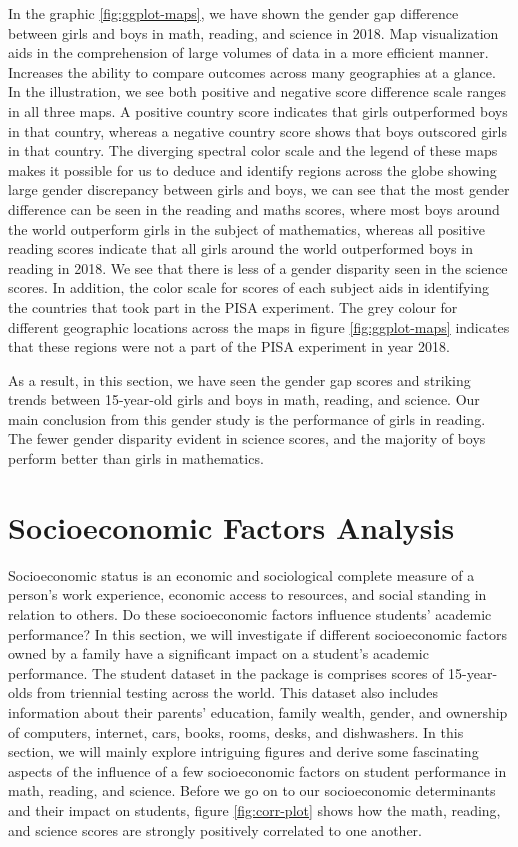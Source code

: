 In the graphic \ref{fig:ggplot-maps}, we have shown the gender gap
difference between girls and boys in math, reading, and science in 2018.
Map visualization aids in the comprehension of large volumes of data in
a more efficient manner. Increases the ability to compare outcomes
across many geographies at a glance. In the illustration, we see both
positive and negative score difference scale ranges in all three maps. A
positive country score indicates that girls outperformed boys in that
country, whereas a negative country score shows that boys outscored
girls in that country. The diverging spectral color scale and the legend
of these maps makes it possible for us to deduce and identify regions
across the globe showing large gender discrepancy between girls and
boys, we can see that the most gender difference can be seen in the
reading and maths scores, where most boys around the world outperform
girls in the subject of mathematics, whereas all positive reading scores
indicate that all girls around the world outperformed boys in reading in
2018. We see that there is less of a gender disparity seen in the
science scores. In addition, the color scale for scores of each subject
aids in identifying the countries that took part in the PISA experiment.
The grey colour for different geographic locations across the maps in
figure \ref{fig:ggplot-maps} indicates that these regions were not a
part of the PISA experiment in year 2018.

As a result, in this section, we have seen the gender gap scores and
striking trends between 15-year-old girls and boys in math, reading, and
science. Our main conclusion from this gender study is the performance
of girls in reading. The fewer gender disparity evident in science
scores, and the majority of boys perform better than girls in
mathematics.

\hypertarget{socioeconomic-factors-analysis}{%
\section{Socioeconomic Factors
Analysis}\label{socioeconomic-factors-analysis}}

Socioeconomic status is an economic and sociological complete measure of
a person's work experience, economic access to resources, and social
standing in relation to others. Do these socioeconomic factors influence
students' academic performance? In this section, we will investigate if
different socioeconomic factors owned by a family have a significant
impact on a student's academic performance. The student dataset in the
 package is comprises scores of 15-year-olds from
triennial testing across the world. This dataset also includes
information about their parents' education, family wealth, gender, and
ownership of computers, internet, cars, books, rooms, desks, and
dishwashers. In this section, we will mainly explore intriguing figures
and derive some fascinating aspects of the influence of a few
socioeconomic factors on student performance in math, reading, and
science. Before we go on to our socioeconomic determinants and their
impact on students, figure \ref{fig:corr-plot} shows how the math,
reading, and science scores are strongly positively correlated to one
another.


